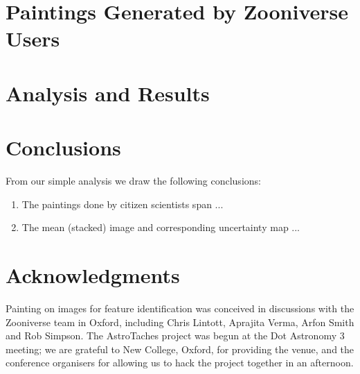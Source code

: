 \documentclass[useAMS,usenatbib]{mn2e}
\begin{document}

\section{Paintings Generated by Zooniverse Users}
\label{sect:data}




\section{Analysis and Results}
\label{sect:results}




\section{Conclusions}
\label{sect:concl}

From our simple analysis we draw the following conclusions:

\begin{enumerate}

\item The paintings done by citizen scientists span ... 

\item The mean (stacked) image and corresponding uncertainty map ... 

\end{enumerate}


\section*{Acknowledgments} 

Painting on images for feature identification 
was conceived in discussions with the Zooniverse team in Oxford,
including Chris Lintott, Aprajita Verma, Arfon Smith and Rob Simpson. The
AstroTaches project was begun at the Dot Astronomy 3 meeting; we are grateful
to New College, Oxford, for providing the venue, and the conference organisers
for allowing us to hack the project together in an afternoon. 
%

\label{lastpage}

% 





\bsp
\end{document}
